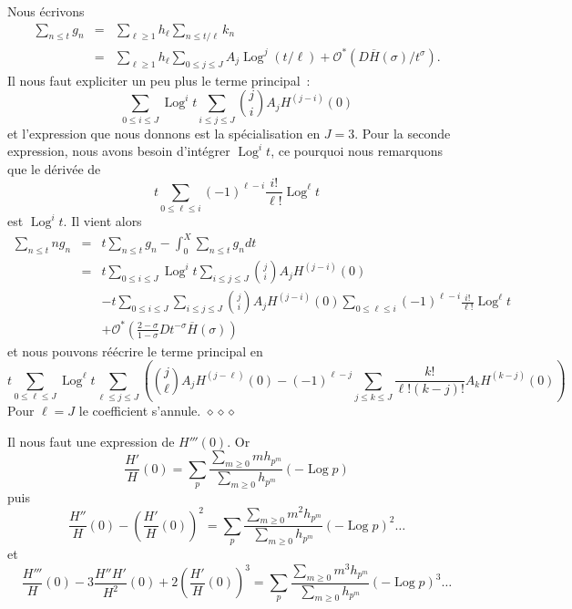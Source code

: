\documentclass[12pt,a4paper,twoside]{article}
\newenvironment{dem}{\medbreak\noindent{\sc Preuve : }}%
{\hfill $\diamond\diamond\diamond$\par\medbreak}
\def\Ocal{\mathcal{O}}
\DeclareMathOperator{\Log}{Log}
\begin{document}
\begin{dem}
  Nous \'ecrivons 
  \begin{eqnarray*}
    \sum_{n\le t}g_n
    &=&\sum_{\ell\ge1}h_{\ell}\sum_{n\le t/\ell}k_n
    \\&=&\sum_{\ell\ge1}h_{\ell}\sum_{0\le j\le J}A_j\Log^j(t/\ell)+
    \Ocal^*(D\overline{H}(\sigma)/t^{\sigma}).
  \end{eqnarray*}
  Il nous faut expliciter un peu plus le terme principal~:
  \begin{equation*}
    \sum_{0\le i\le J}\Log^{i}t\sum_{i\le j\le J}\binom{j}{i}A_jH^{(j-i)}(0)
  \end{equation*}
 et l'expression que nous donnons est la sp\'ecialisation en $J=3$. Pour la
 seconde expression, nous avons besoin d'int\'egrer $\Log^it$, ce pourquoi
 nous remarquons que le d\'eriv\'ee de
 \begin{equation*}
   t\sum_{0\le \ell\le i}(-1)^{\ell-i}\frac{i!}{\ell!}\Log^\ell t
 \end{equation*}
  est $\Log^it$. Il vient alors
  \begin{eqnarray*}
    \sum_{n\le t}n g_n
    &=&t\sum_{n\le t}g_n-\int_0^X\sum_{n\le t}g_ndt
    \\&=&
    t\sum_{0\le i\le J}\Log^{i}t\sum_{i\le j\le J}\binom{j}{i}A_jH^{(j-i)}(0)
    \\&&-t\sum_{0\le i\le J}\sum_{i\le j\le J}\binom{j}{i}A_jH^{(j-i)}(0)
    \sum_{0\le \ell\le i}(-1)^{\ell-i}\frac{i!}{\ell!}\Log^\ell t
    \\&&+
    \Ocal^*(\frac{2-\sigma}{1-\sigma}D
    t^{-\sigma}\overline{H}(\sigma))
  \end{eqnarray*}
  et nous pouvons r\'e\'ecrire le terme principal en
  \begin{equation*}
    t\sum_{0\le \ell\le J}\Log^{\ell}t\sum_{\ell\le j\le J}
    \left(\binom{j}{\ell}A_jH^{(j-\ell)}(0)
    -(-1)^{\ell-j}\sum_{j\le k\le J}\frac{k!}{\ell!(k-j)!}A_k H^{(k-j)}(0)
    \right)
  \end{equation*}
  Pour $\ell=J$ le coefficient s'annule.
\end{dem}

Il nous faut une expression de $H'''(0)$.
Or
\begin{equation}
  \frac{H'}{H}(0)=\sum_{p}\frac{\sum_{m\ge0}mh_{p^m}}{\sum_{m\ge0}h_{p^m}}(-\Log p)
\end{equation}
puis
\begin{equation}
  \frac{H''}{H}(0)-\left( \frac{H'}{H}(0)\right)^2
  =\sum_{p}\frac{\sum_{m\ge0}m^2h_{p^m}}{\sum_{m\ge0}h_{p^m}}(-\Log p)^2\dots
\end{equation}
et
\begin{equation}
  \frac{H'''}{H}(0)-3\frac{H''H'}{H^2}(0)+2\left( \frac{H'}{H}(0)\right)^3
  =\sum_{p}\frac{\sum_{m\ge0}m^3h_{p^m}}{\sum_{m\ge0}h_{p^m}}(-\Log p)^3\dots
\end{equation}
\end{document}
